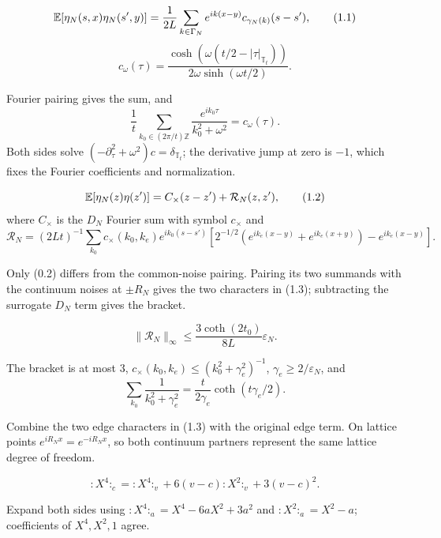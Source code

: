\documentclass[11pt,a4paper]{article}
\newcommand{\eps}{\varepsilon}
\newcommand{\T}{\mathbb T}
\begin{document}
\[
 \mathbb E[\eta_N(s,x)\eta_N(s',y)]
 =\frac1{2L}\sum_{k\in\Gamma_N}e^{ik(x-y)}c_{\gamma_N(k)}(s-s'),\tag{1.1}
\]
\[
 c_\omega(\tau)=
 \frac{\cosh(\omega(t/2-|\tau|_{\T_t}))}{2\omega\sinh(\omega t/2)}.
\]

\Because Fourier pairing gives the sum, and
\[
 \frac1t\sum_{k_0\in(2\pi/t)\mathbb Z}
 \frac{e^{ik_0\tau}}{k_0^2+\omega^2}=c_\omega(\tau).
\]
Both sides solve $(-\partial_\tau^2+\omega^2)c=\delta_{\T_t}$; the derivative
jump at zero is $-1$, which fixes the Fourier coefficients and normalization.

\[
 \mathbb E[\eta_N(z)\eta(z')]=C_\times(z-z')+\mathcal R_N(z,z'),\tag{1.2}
\]
where $C_\times$ is the $D_N$ Fourier sum with symbol $c_\times$ and
\[
 \mathcal R_N=(2Lt)^{-1}\sum_{k_0}c_\times(k_0,k_e)e^{ik_0(s-s')}
 \left[2^{-1/2}(e^{ik_e(x-y)}+e^{ik_e(x+y)})-e^{ik_e(x-y)}\right].
\tag{1.3}
\]

\Because Only (0.2) differs from the common-noise pairing.  Pairing its two summands
with the continuum noises at $\pm R_N$ gives the two characters in (1.3); subtracting
the surrogate $D_N$ term gives the bracket.

\LS{2}{5}{For $\eps_N\le1/2$,}
\[
 \|\mathcal R_N\|_\infty\le
 \frac{3\coth(2t_0)}{8L}\eps_N.\tag{1.4}
\]

\Because The bracket is at most $3$, $c_\times(k_0,k_e)\le
(k_0^2+\gamma_e^2)^{-1}$, $\gamma_e\ge2/\eps_N$, and
\[
 \sum_{k_0}\frac1{k_0^2+\gamma_e^2}
 =\frac{t}{2\gamma_e}\coth(t\gamma_e/2).
\]


\Because Combine the two edge characters in (1.3) with the original edge term.  On
lattice points $e^{iR_Nx}=e^{-iR_Nx}$, so both continuum partners represent the same
lattice degree of freedom.

\QedStep


\[
 {:}X^4{:}_c={:}X^4{:}_v+6(v-c){:}X^2{:}_v+3(v-c)^2.\tag{2.1}
\]

\Because Expand both sides using
${:}X^4{:}_a=X^4-6aX^2+3a^2$ and
${:}X^2{:}_a=X^2-a$; coefficients of $X^4,X^2,1$ agree.
\end{document}

